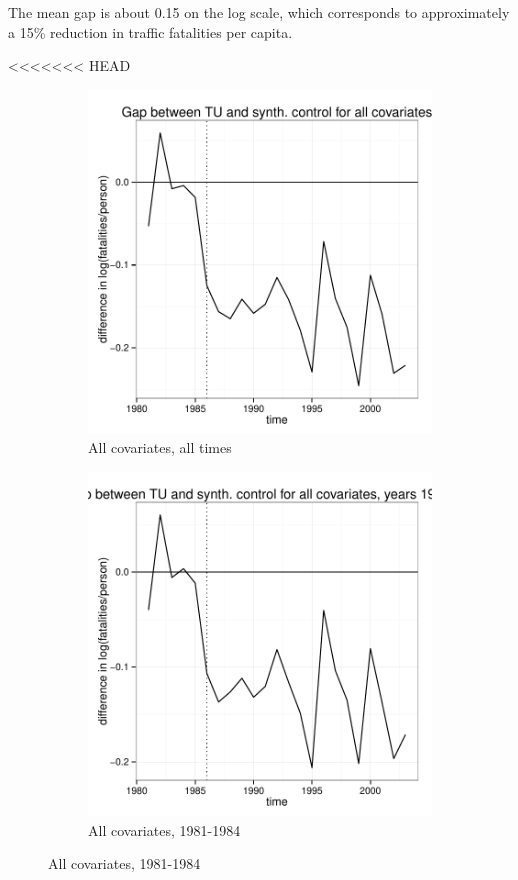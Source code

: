 \documentclass[letterpaper, 12pt]{article}
\begin{document}
The mean gap is about 0.15 on the log scale, which corresponds to approximately a 15\% reduction in traffic fatalities per capita. 

<<<<<<< HEAD
\begin{figure}
  \begin{centering}
    \begin{subfigure}[b]{\textwidth}
      \includegraphics{img-gap-full.pdf}
      \caption{All covariates, all times}
      \label{fig:c11a}
    \end{subfigure}
    
    \begin{subfigure}[b]{\textwidth}
      \includegraphics{img-gap-full1984.pdf}
      \caption{All covariates, 1981-1984}
      \label{fig:c11b}
    \end{subfigure}


\end{centering}
\end{figure}
\end{document}

